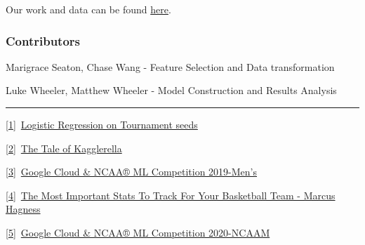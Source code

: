 \documentclass[
]{article}
\begin{document}
{Our work and data can be found
}{\href{https://www.google.com/url?q=https://github.com/COMP562-Machine-Learning/NCAA_bracket_model\&sa=D\&ust=1588630893461000}{here}}{.
}

\hypertarget{h.jq7aj7tso0kj}{%
\subsubsection{\texorpdfstring{{Contributors
}}{Contributors }}\label{h.jq7aj7tso0kj}}

{Marigrace Seaton, Chase Wang - Feature Selection and Data
transformation}

{Luke Wheeler, Matthew Wheeler - Model Construction and Results Analysis
}

\begin{center}\rule{0.5\linewidth}{0.5pt}\end{center}

\protect\hyperlink{ftnt_ref1}{{[}1{]}}{~}{\href{https://www.google.com/url?q=https://www.kaggle.com/kplauritzen/notebookde27b18258\&sa=D\&ust=1588630893463000}{Logistic
Regression on Tournament seeds}}

\protect\hyperlink{ftnt_ref2}{{[}2{]}}{~}{\href{https://www.google.com/url?q=https://www.kaggle.com/iamleonie/the-tale-of-kagglerella\&sa=D\&ust=1588630893464000}{The
Tale of Kagglerella}}

\protect\hyperlink{ftnt_ref3}{{[}3{]}}{~}{\href{https://www.google.com/url?q=https://www.kaggle.com/c/mens-machine-learning-competition-2019/data\&sa=D\&ust=1588630893462000}{Google
Cloud \& NCAA® ML Competition 2019-Men's}}{~}

\protect\hyperlink{ftnt_ref4}{{[}4{]}}{~}{\href{https://www.google.com/url?q=https://www.breakthroughbasketball.com/stats/how-we-use-stats-Hagness.html\&sa=D\&ust=1588630893463000}{The
Most Important Stats To Track For Your Basketball Team - Marcus
Hagness}}{~}

\protect\hyperlink{ftnt_ref5}{{[}5{]}}{~}{\href{https://www.google.com/url?q=https://www.kaggle.com/c/google-cloud-ncaa-march-madness-2020-division-1-mens-tournament\&sa=D\&ust=1588630893464000}{Google
Cloud \& NCAA® ML Competition 2020-NCAAM}}{~}
\end{document}
